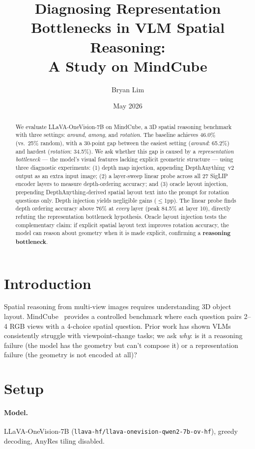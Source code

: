 \documentclass[11pt]{article}
\title{Diagnosing Representation Bottlenecks in VLM Spatial Reasoning:\\
A Study on MindCube}
\author{Bryan Lim}
\date{May 2026}
\begin{document}
\maketitle

\begin{abstract}
We evaluate LLaVA-OneVision-7B on MindCube, a 3D spatial reasoning benchmark
with three settings: \textit{around}, \textit{among}, and \textit{rotation}.
The baseline achieves 46.0\% (vs.\ 25\% random), with a 30-point gap between
the easiest setting (\textit{around}: 65.2\%) and hardest (\textit{rotation}: 34.5\%).
We ask whether this gap is caused by a \emph{representation bottleneck} ---
the model's visual features lacking explicit geometric structure ---
using three diagnostic experiments:
(1) depth map injection, appending DepthAnything~v2 output as an extra input image;
(2) a layer-sweep linear probe across all 27 SigLIP encoder layers to measure
depth-ordering accuracy; and (3) oracle layout injection, prepending
DepthAnything-derived spatial layout text into the prompt for rotation questions only.
Depth injection yields negligible gains ($\leq$1pp).
The linear probe finds depth ordering accuracy above 76\% at \emph{every} layer
(peak 84.5\% at layer 10), directly refuting the representation bottleneck hypothesis.
Oracle layout injection tests the complementary claim: if explicit spatial layout
text improves rotation accuracy, the model can reason about geometry when it is
made explicit, confirming a \textbf{reasoning bottleneck}.
\end{abstract}

\section{Introduction}
Spatial reasoning from multi-view images requires understanding 3D object layout.
MindCube~\cite{mindcube} provides a controlled benchmark where each question
pairs 2--4 RGB views with a 4-choice spatial question.
Prior work has shown VLMs consistently struggle with viewpoint-change tasks;
we ask \emph{why}: is it a reasoning failure (the model has the geometry but
can't compose it) or a representation failure (the geometry is not encoded at all)?

\section{Setup}

\paragraph{Model.}
LLaVA-OneVision-7B (\texttt{llava-hf/llava-onevision-qwen2-7b-ov-hf}),
greedy decoding, AnyRes tiling disabled.
\end{document}
